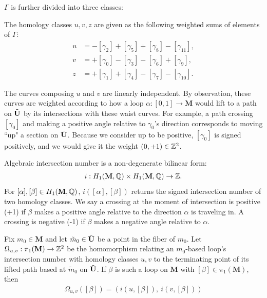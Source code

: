 \documentclass[]{article}
\def\bM{\mathbf{M}}
\def\mtild{\tilde{m}_0}
\begin{document}
\noindent $\Gamma$ is further divided into three classes:
\begin{Def}
The homology classes $u,v,z$ are given as the following weighted sums of elements of $\Gamma$:
\begin{align*}
u &= -[\gamma_2] +[\gamma_5] + [\gamma_8] - [\gamma_{11}],\\
v &= +[\gamma_0] -[\gamma_3] -[\gamma_6] +[\gamma_9],\\
z &= +[\gamma_1] +[\gamma_4]-[\gamma_7]-[\gamma_{10}].
\end{align*}
\end{Def}

The curves composing $u$ and $v$ are linearly independent. By observation, these curves are weighted according to how a loop $\alpha:[0,1]\rightarrow\bM$ would lift to a path on $\tilde{\mathbf{U}}$ by its intersections with these waist curves. For example, a path crossing $[\gamma_0]$ and making a positive angle relative to $\gamma_0$'s direction corresponds to moving ``up" a section on $\tilde{\mathbf{U}}$. Because we consider up to be positive, $[\gamma_0]$ is signed positively, and we would give it the weight $(0,+1)\in\mathbb{Z}^2$. 

\begin{Def}
Algebraic intersection number is a non-degenerate bilinear form:
\begin{align*}
i:H_1(\bM,\QQ)\times H_1(\bM,\QQ)\rightarrow\ZZ.
\end{align*}
For $[\alpha],[\beta]\in H_1(\mathbf{M},\mathbb{Q})$, $i([\alpha],[\beta])$ returns the signed intersection number of two homology classes. We say a crossing at the moment of intersection is positive (+1) if $\beta$ makes a positive angle relative to the direction $\alpha$ is traveling in. A crossing is negative (-1) if $\beta$ makes a negative angle relative to $\alpha$.
\end{Def}

\begin{Def}
Fix $m_0\in\bM$ and let $\mtild\in\btU$ be a point in the fiber of $m_0$. Let $\Omega_{u,v}:\pi_1(\bM)\rightarrow \ZZ^2$ be the homomorphism relating an $m_0$-based loop's intersection number with homology classes $u,v$ to the terminating point of its lifted path based at $\mtild$ on $\tilde{\mathbf{U}}$. If $\beta$ is such a loop on $\bM$ with $[\beta]\in\pi_1(\bM)$, then 
\begin{align*}
\Omega_{u,v}([\beta])=(i(u,[\beta]),~i(v,[\beta]))
\end{align*}
\end{Def}
\end{document}
